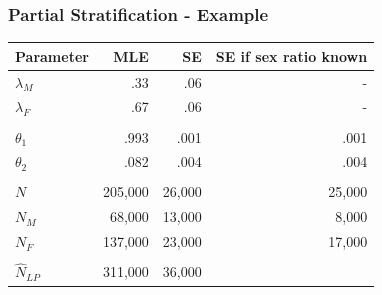 \documentclass{beamer}
\begin{document}
\begin{frame} \frametitle{Partial Stratification - Example}
\begin{tabular}{lrrr}
\hline
Parameter        & MLE       & SE     &  SE  if sex ratio known \\ \hline
$\lambda_{M}$ & .33     & .06   &   - \\ 
$\lambda_{F}$  & .67     & .06   &  - \\ \hline
\\ 
$\theta_{1}$     & .993     & .001  &  .001 \\ 
$\theta_{2}$     & .082    &  .004  &  .004 \\ \hline
\\
$N$         & 205,000     	 &   26,000   &  25,000    \\ \hline
$N_{M}$ &  68,000     	 &   13,000     &   8,000  \\ 
$N_{F}$ & 137,000          &   23,000    &  17,000    \\ \hline \hline
\\
$\hat{N}_{LP}$ & 311,000   & 36,000  & \\ \hline

\end{tabular}


\end{frame}
\end{document}
